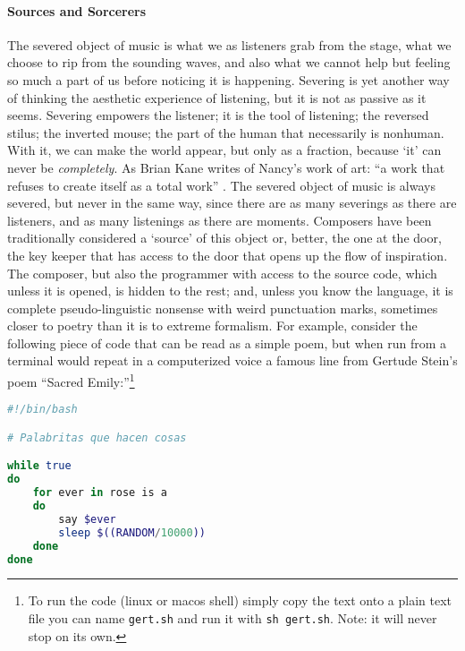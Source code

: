 \paragraph{Sources and Sorcerers}
The severed object of music is what we as listeners grab from the stage, what we choose to rip from the sounding waves, and also what we cannot help but feeling so much a part of us before noticing it is happening. Severing is yet another way of thinking the aesthetic experience of listening, but it is not as passive as it seems. Severing empowers the listener; it is the tool of listening; the reversed stilus; the inverted mouse; the part of the human that necessarily is nonhuman. With it, we can make the world appear, but only as a fraction, because `it' can never be \textit{completely}. As Brian Kane writes of Nancy's work of art: ``a work that refuses to create itself as a total work'' \parencite[29]{Gra15:The}. The severed object of music is always severed, but never in the same way, since there are as many severings as there are listeners, and as many listenings as there are moments. Composers have been traditionally considered a `source' of this object or, better, the one at the door, the key keeper that has access to the door that opens up the flow of inspiration. The composer, but also the programmer with access to the source code, which unless it is opened, is hidden to the rest; and, unless you know the language, it is complete pseudo-linguistic nonsense with weird punctuation marks, sometimes closer to poetry than it is to extreme formalism. For example, consider the following piece of code that can be read as a simple poem, but when run from a terminal would repeat in a computerized voice a famous line from Gertude Stein's poem ``Sacred Emily:''\footnote{To run the code (linux or macos shell) simply copy the text onto a plain text file you can name \texttt{gert.sh} and run it with \texttt{sh gert.sh}. Note: it will never stop on its own.}

\begin{flushleft}
\small
\begin{lstlisting}[caption={Little words that do things.},captionpos=b,language=bash,mathescape=false]
#!/bin/bash

# Palabritas que hacen cosas

while true
do
	for ever in rose is a
	do 
		say $ever
		sleep $((RANDOM/10000))
	done
done

\end{lstlisting}
\end{flushleft}

